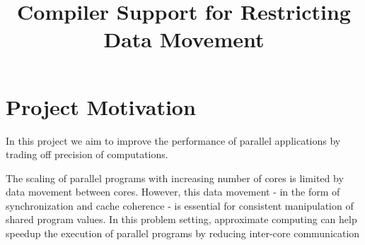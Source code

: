 \documentclass[12pt,conference]{IEEEtran}
\begin{document}
%
\title{Compiler Support for Restricting Data Movement}


\author{
\and
{}
}



\maketitle






%
\IEEEpeerreviewmaketitle



\section{Project Motivation}

In this project we aim to improve the performance of parallel 
applications by trading off precision of computations. 

The scaling of parallel programs with increasing number of cores
is limited by data movement between cores. However, this data 
movement - in the form of synchronization and cache coherence - 
is essential for consistent manipulation of shared program values.
In this problem setting, approximate computing can help speedup the 
execution of parallel programs by reducing inter-core communication
\end{document}

